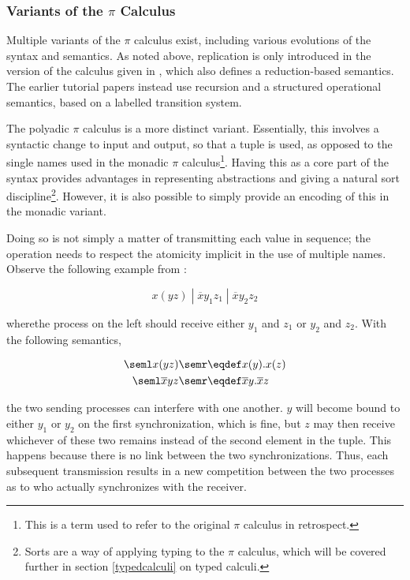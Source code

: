 \subsubsection{Variants of the $\pi$ Calculus}
\label{pivariants}

Multiple variants of the $\pi$ calculus exist, including various
evolutions of the syntax and semantics.  As noted above, replication
is only introduced in the version of the calculus given in
\cite{funcproc}, which also defines a reduction-based semantics.  The
earlier tutorial papers \cite{picalctutorial} instead use recursion
and a structured operational semantics, based on a labelled transition
system.

The polyadic $\pi$ calculus \cite{milner:93polyadic} is a more
distinct variant.  Essentially, this involves a syntactic change to
input and output, so that a tuple is used, as opposed to the single
names used in the monadic $\pi$ calculus\footnote{This is a term used
  to refer to the original $\pi$ calculus in retrospect.}.  Having
this as a core part of the syntax provides advantages in representing
abstractions and giving a natural sort discipline\footnote{Sorts are a
  way of applying typing to the $\pi$ calculus, which will be covered
  further in section \ref{typedcalculi} on typed calculi.}.  However,
it is also possible to simply provide an encoding of this in the
monadic variant.

Doing so is not simply a matter of transmitting each value in
sequence; the operation needs to respect the atomicity implicit in the
use of multiple names.  Observe the following example from
\cite{milner:93polyadic}:

\begin{equation}
x(yz)\;|\;\overline{x}y_1z_1\;|\;\overline{x}y_2z_2
\end{equation}

\noindent wherethe process on the left should receive either $y_1$ and
$z_1$ or $y_2$ and $z_2$.  With the following semantics,

\begin{align}
\seml x(yz) \semr & \eqdef x(y).x(z) \\
\seml \overline{x}yz \semr & \eqdef \overline{x}y.\overline{x}z
\end{align}

\noindent the two sending processes can interfere with one another.
$y$ will become bound to either $y_1$ or $y_2$ on the first
synchronization, which is fine, but $z$ may then receive whichever of
these two remains instead of the second element in the tuple.  This
happens because there is no link between the two synchronizations.
Thus, each subsequent transmission results in a new competition
between the two processes as to who actually synchronizes with the
receiver.

